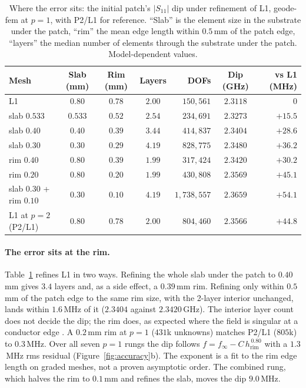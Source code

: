 \documentclass{anvil-paper}
\newcommand{\PL}{P2/L1}
\begin{document}
\begin{table}[t]
  \centering
  \caption{Where the error sits: the initial patch's $|S_{11}|$ dip under
  refinement of L1, geode-fem at $p = 1$, with \PL{} for reference. ``Slab''
  is the element size in the substrate under the patch, ``rim'' the mean edge
  length within $0.5$\,mm of the patch edge, ``layers'' the median number of
  elements through the substrate under the patch. Model-dependent values.}
  \label{tab:x1}
  \small
  \begin{tabular}{@{}l c c c r c r@{}}
    \toprule
    Mesh & Slab (mm) & Rim (mm) & Layers & DOFs & Dip (GHz) & vs L1 (MHz) \\
    \midrule
    L1 & $0.80$ & $0.78$ & $2.00$ & $150{,}561$ & $2.3118$ & $0$ \\
    slab $0.533$ & $0.533$ & $0.52$ & $2.54$ & $234{,}691$ & $2.3273$ & $+15.5$ \\
    slab $0.40$ & $0.40$ & $0.39$ & $3.44$ & $414{,}837$ & $2.3404$ & $+28.6$ \\
    slab $0.30$ & $0.30$ & $0.29$ & $4.19$ & $828{,}775$ & $2.3480$ & $+36.2$ \\
    rim $0.40$ & $0.80$ & $0.39$ & $1.99$ & $317{,}424$ & $2.3420$ & $+30.2$ \\
    rim $0.20$ & $0.80$ & $0.20$ & $1.99$ & $430{,}808$ & $2.3569$ & $+45.1$ \\
    slab $0.30$ + rim $0.10$ & $0.30$ & $0.10$ & $4.19$ & $1{,}738{,}557$ & $2.3659$ & $+54.1$ \\
    \midrule
    L1 at $p = 2$ (\PL) & $0.80$ & $0.78$ & $2.00$ & $804{,}460$ & $2.3566$ & $+44.8$ \\
    \bottomrule
  \end{tabular}
\end{table}

\paragraph{The error sits at the rim.}
Table~\ref{tab:x1} refines L1 in two ways. Refining the whole slab under the
patch to $0.40$\,mm gives $3.4$ layers and, as a side effect, a $0.39$\,mm
rim. Refining only within $0.5$\,mm of the patch edge to the same rim size,
with the 2-layer interior unchanged, lands within $1.6$\,MHz of it
($2.3404$ against $2.3420$\,GHz). The interior layer count does not decide
the dip; the rim does, as expected where the field is singular at a
conductor edge \citep{meixner1972behavior}. A $0.2$\,mm rim at $p = 1$
($431$k unknowns) matches \PL{} ($805$k) to $0.3$\,MHz. Over all seven
$p = 1$ rungs the dip follows $f = f_\infty - C\,h_{\mathrm{rim}}^{\,0.80}$
with a $1.3$\,MHz rms residual (Figure~\ref{fig:accuracy}b). The exponent is
a fit to the rim edge length on graded meshes, not a proven
asymptotic order. The combined rung, which halves the rim to $0.1$\,mm and
refines the slab, moves the dip $9.0$\,MHz.
\end{document}
